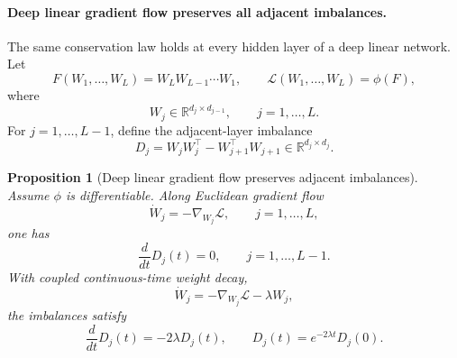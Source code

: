 \documentclass{article}
\newtheorem{proposition}{Proposition}
\newcommand{\R}{\mathbb{R}}
\newcommand{\Loss}{\mathcal{L}}
\begin{document}
\paragraph{Deep linear gradient flow preserves all adjacent imbalances.}
The same conservation law holds at every hidden layer of a deep linear
network.  Let
\[
    F(W_1,\ldots,W_L)=W_LW_{L-1}\cdots W_1,
    \qquad
    \Loss(W_1,\ldots,W_L)=\phi(F),
\]
where
\[
    W_j\in\R^{d_j\times d_{j-1}},
    \qquad
    j=1,\ldots,L.
\]
For \(j=1,\ldots,L-1\), define the adjacent-layer imbalance
\[
    D_j
    =
    W_jW_j^\top
    -
    W_{j+1}^\top W_{j+1}
    \in\R^{d_j\times d_j}.
\]

\begin{proposition}[Deep linear gradient flow preserves adjacent imbalances]
Assume \(\phi\) is differentiable.  Along Euclidean gradient flow
\[
    \dot W_j=-\nabla_{W_j}\Loss,
    \qquad
    j=1,\ldots,L,
\]
one has
\[
    \frac{d}{dt}D_j(t)=0,
    \qquad
    j=1,\ldots,L-1.
\]
With coupled continuous-time weight decay,
\[
    \dot W_j=-\nabla_{W_j}\Loss-\lambda W_j,
\]
the imbalances satisfy
\[
    \frac{d}{dt}D_j(t)=-2\lambda D_j(t),
    \qquad
    D_j(t)=e^{-2\lambda t}D_j(0).
\]
\end{proposition}
\end{document}
